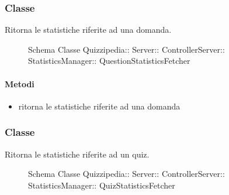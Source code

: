 \subsubsection{Classe }
Ritorna le statistiche riferite ad una domanda.
\begin{figure}[H]
\centering
\noindent{}
\caption[Schema Classe QuestionStatisticsFetcher]{Schema Classe Quizzipedia:: Server:: ControllerServer:: StatisticsManager:: QuestionStatisticsFetcher}
\end{figure}
\paragraph{Metodi}
\begin{itemize}
\item {}
\newline
ritorna le statistiche riferite ad una domanda
\newline
\end{itemize}
\subsubsection{Classe }
Ritorna le statistiche riferite ad un quiz.
\begin{figure}[H]
\centering
\noindent{}
\caption[Schema Classe QuizStatisticsFetcher]{Schema Classe Quizzipedia:: Server:: ControllerServer:: StatisticsManager:: QuizStatisticsFetcher}
\end{figure}
